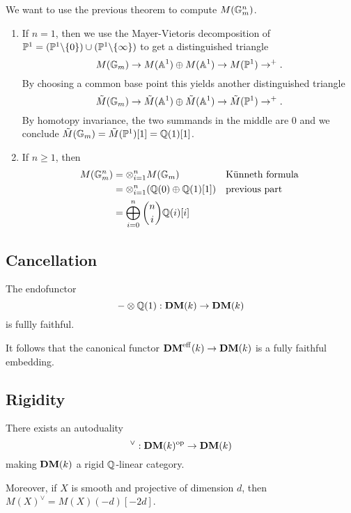 \begin{exam}\label{exam:9-gm}
  We want to use the previous theorem to compute $M(\mathbb{G}_m^n)$.
  \begin{enumerate}
  \item If $n=1$, then we use the Mayer-Vietoris decomposition of
    $\mathbb{P}^{1} =
    (\mathbb{P}^{1}\backslash\{0\})\cup(\mathbb{P}^{1}\backslash\{\infty\})$
    to get a distinguished triangle
    \begin{equation*}
      M(\mathbb{G}_m) \to M(\mathbb{A}^1) \oplus M(\mathbb{A}^1) \to M(\mathbb{P}^1) \to^{+}.
    \end{equation*}
    By choosing a common base point this yields another distinguished
    triangle
    \begin{equation*}
      \tilde{M}(\mathbb{G}_m) \to \tilde{M}(\mathbb{A}^1) \oplus \tilde{M}(\mathbb{A}^1) \to \tilde{M}(\mathbb{P}^1) \to^{+}.
    \end{equation*}
    By homotopy invariance, the two summands in the middle are 0 and
    we conclude $\tilde{M}(\mathbb{G}_m)=\tilde{M}(\mathbb{P}^{1})[1]=\mathbb{Q}(1)[1]$.
  \item If $n \geq 1$, then
    \begin{align*}
      M(\mathbb{G}_m^n) &= \otimes_{i=1}^{n} M(\mathbb{G}_m)&&\text{Künneth formula}\\
      &= \otimes_{i=1}^{n}(\mathbb{Q}(0) \oplus \mathbb{Q}(1)[1]) &&\text{previous part}\\
      &= \bigoplus_{i=0}^n \binom{n}{i} \mathbb{Q}(i)[i]
    \end{align*}
  \end{enumerate}
\end{exam}

\subsection{Cancellation}

\begin{thm}
The endofunctor 
\begin{equation*}
- \otimes \mathbb{Q}(1) : \mathbf{DM}(k) \to \mathbf{DM}(k)
\end{equation*}
is fullly faithful.
\end{thm}
It follows that the canonical functor $\mathbf{DM}^{\mathrm{eff}}(k)\to\mathbf{DM}(k)$
is a fully faithful embedding.

\subsection{Rigidity}

\begin{thm}
  There exists an autoduality
  \begin{equation*}
    ^{\vee}:\mathbf{DM}(k)^{\mathrm{op}}\to\mathbf{DM}(k)
  \end{equation*}
  making $\mathbf{DM}(k)$ a rigid $\mathbb{Q}$-linear category.

  Moreover, if $X$ is smooth and projective of dimension $d$, then
  $M(X)^{\vee}=M(X)(-d)[-2d]$.
\end{thm}

